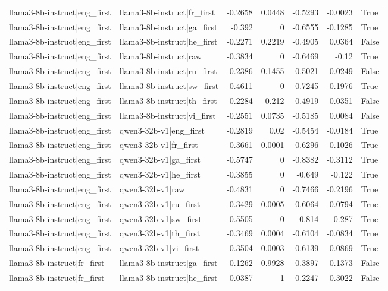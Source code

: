 \begin{table}
\begin{tabular}{l l r r r r l}
llama3-8b-instruct|eng_first & llama3-8b-instruct|fr_first & -0.2658 & 0.0448 & -0.5293 & -0.0023 & True \\
llama3-8b-instruct|eng_first & llama3-8b-instruct|ga_first & -0.392 & 0 & -0.6555 & -0.1285 & True \\
llama3-8b-instruct|eng_first & llama3-8b-instruct|he_first & -0.2271 & 0.2219 & -0.4905 & 0.0364 & False \\
llama3-8b-instruct|eng_first & llama3-8b-instruct|raw & -0.3834 & 0 & -0.6469 & -0.12 & True \\
llama3-8b-instruct|eng_first & llama3-8b-instruct|ru_first & -0.2386 & 0.1455 & -0.5021 & 0.0249 & False \\
llama3-8b-instruct|eng_first & llama3-8b-instruct|sw_first & -0.4611 & 0 & -0.7245 & -0.1976 & True \\
llama3-8b-instruct|eng_first & llama3-8b-instruct|th_first & -0.2284 & 0.212 & -0.4919 & 0.0351 & False \\
llama3-8b-instruct|eng_first & llama3-8b-instruct|vi_first & -0.2551 & 0.0735 & -0.5185 & 0.0084 & False \\
llama3-8b-instruct|eng_first & qwen3-32b-v1|eng_first & -0.2819 & 0.02 & -0.5454 & -0.0184 & True \\
llama3-8b-instruct|eng_first & qwen3-32b-v1|fr_first & -0.3661 & 0.0001 & -0.6296 & -0.1026 & True \\
llama3-8b-instruct|eng_first & qwen3-32b-v1|ga_first & -0.5747 & 0 & -0.8382 & -0.3112 & True \\
llama3-8b-instruct|eng_first & qwen3-32b-v1|he_first & -0.3855 & 0 & -0.649 & -0.122 & True \\
llama3-8b-instruct|eng_first & qwen3-32b-v1|raw & -0.4831 & 0 & -0.7466 & -0.2196 & True \\
llama3-8b-instruct|eng_first & qwen3-32b-v1|ru_first & -0.3429 & 0.0005 & -0.6064 & -0.0794 & True \\
llama3-8b-instruct|eng_first & qwen3-32b-v1|sw_first & -0.5505 & 0 & -0.814 & -0.287 & True \\
llama3-8b-instruct|eng_first & qwen3-32b-v1|th_first & -0.3469 & 0.0004 & -0.6104 & -0.0834 & True \\
llama3-8b-instruct|eng_first & qwen3-32b-v1|vi_first & -0.3504 & 0.0003 & -0.6139 & -0.0869 & True \\
llama3-8b-instruct|fr_first & llama3-8b-instruct|ga_first & -0.1262 & 0.9928 & -0.3897 & 0.1373 & False \\
llama3-8b-instruct|fr_first & llama3-8b-instruct|he_first & 0.0387 & 1 & -0.2247 & 0.3022 & False \\

\end{tabular}
\end{table}
